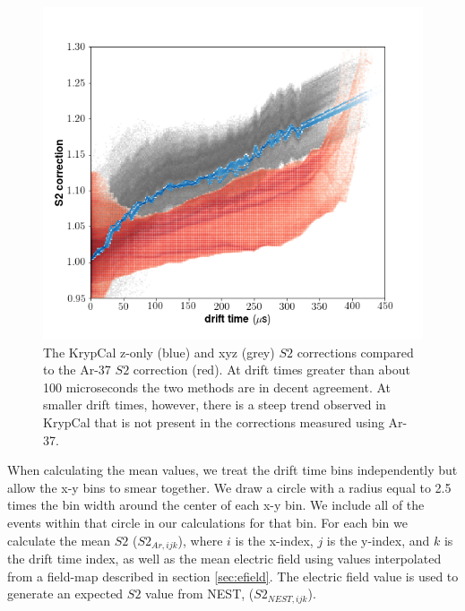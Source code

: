 {\begin{figure}[h!]
\centering
\includegraphics[width=150mm]{Figures/S2corr_dt.png}
\caption{The KrypCal z-only (blue) and xyz (grey) $S2$ corrections compared to the Ar-37 $S2$ correction (red). At drift times greater than about 100 microseconds the two methods are in decent agreement. At smaller drift times, however, there is a steep trend observed in KrypCal that is not present in the corrections measured using Ar-37.}
\label{fig:S2corr_dt} 
\end{figure}
When calculating the mean values, we treat the drift time bins independently but allow the x-y bins to smear together. We draw a circle with a radius equal to 2.5 times the bin width around the center of each  x-y bin. We include all of the events within that circle in our calculations for that bin. For each bin we calculate the mean $S2$ ($S2_{Ar,ijk}$), where $i$ is the x-index, $j$ is the y-index, and $k$ is the drift time index, as well as the mean electric field using values interpolated from a field-map described in section \ref{sec:efield}. The electric field value is used to generate an expected $S2$ value from NEST, ($S2_{NEST,ijk}$).

}
